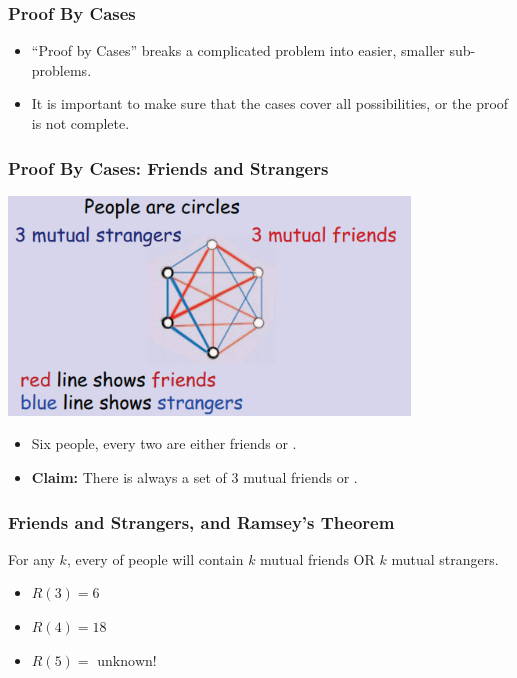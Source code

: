 \begin{frame}
  \frametitle{Proof By Cases}

  \begin{itemize}
  \item ``Proof by Cases'' breaks a complicated problem into easier, smaller sub-problems.

    \bigskip

  \item It is important to make sure that \alert{the cases cover all possibilities}, or the
    proof is not complete.
  \end{itemize}
\end{frame}

\begin{frame}
  \frametitle{Proof By Cases: Friends and Strangers}

  \begin{center}
    \includegraphics[width=0.8\textwidth]{../img/friends_and_strangers}
  \end{center}

  \begin{itemize}
  \item Six people, every two are either \alert{friends} or .
  \item {\bf Claim:} There is always a set of \alert{3 mutual
    friends} or .
  \end{itemize}

\end{frame}

\begin{frame}
  \frametitle{Friends and Strangers, and Ramsey's Theorem}

  For any $k$, every  of people
  will contain $k$ mutual friends OR $k$ mutual strangers.

  \bigskip

  \begin{itemize}
  \item $R(3) = 6$
  \item $R(4) = 18$
  \item $R(5) = \text{ unknown!}$
  \end{itemize}
\end{frame}

